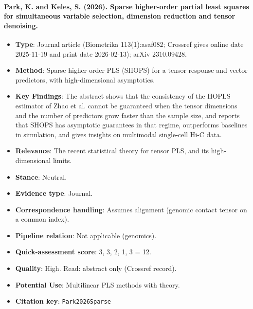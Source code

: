 \documentclass[journal,onecolumn]{IEEEtran}
\begin{document}
\paragraph{Park, K. and Keles, S. (2026). Sparse higher-order partial least squares for simultaneous variable selection, dimension reduction and tensor denoising.~\cite{Park2026Sparse}}\mbox{}

\begin{itemize}

\item{} \textbf{Type}: Journal article (Biometrika 113(1):asaf082; Crossref gives online date 2025-11-19 and print date 2026-02-13); arXiv 2310.09428.

\item{} \textbf{Method}: Sparse higher-order PLS (SHOPS) for a tensor response and vector predictors, with high-dimensional asymptotics.

\item{} \textbf{Key Findings}: The abstract shows that the consistency of the HOPLS estimator of Zhao et al. cannot be guaranteed when the tensor dimensions and the number of predictors grow faster than the sample size, and reports that SHOPS has asymptotic guarantees in that regime, outperforms baselines in simulation, and gives insights on multimodal single-cell Hi-C data.

\item{} \textbf{Relevance}: The recent statistical theory for tensor PLS, and its high-dimensional limits.

\item{} \textbf{Stance}: Neutral.

\item{} \textbf{Evidence type}: Journal.

\item{} \textbf{Correspondence handling}: Assumes alignment (genomic contact tensor on a common index).

\item{} \textbf{Pipeline relation}: Not applicable (genomics).

\item{} \textbf{Quick-assessment score}: 3, 3, 2, 1, 3 = 12.

\item{} \textbf{Quality}: High. Read: abstract only (Crossref record).

\item{} \textbf{Potential Use}: Multilinear PLS methods with theory.

\item{} \textbf{Citation key}: \texttt{Park2026Sparse}

\end{itemize}
\end{document}
